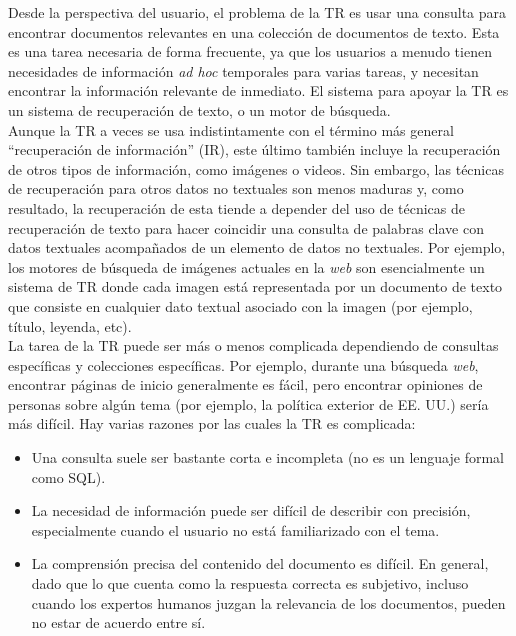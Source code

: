 Desde la perspectiva del usuario, el problema de la TR es usar una consulta para encontrar documentos relevantes en una colección de documentos de texto. Esta es una tarea necesaria de forma frecuente, ya que los usuarios a menudo tienen necesidades de información \textit{ad hoc} temporales para varias tareas, y necesitan encontrar la información relevante de inmediato. El sistema para apoyar la TR es un sistema de recuperación de texto, o un motor de búsqueda. \\

Aunque la TR a veces se usa indistintamente con el término más general ``recuperación de información'' (IR), este último también incluye la recuperación de otros tipos de información, como imágenes o videos. Sin embargo, las técnicas de recuperación para otros datos no textuales son menos maduras y, como resultado, la recuperación de esta tiende a depender del uso de técnicas de recuperación de texto para hacer coincidir una consulta de palabras clave con datos textuales acompañados de un elemento de datos no textuales. Por ejemplo, los motores de búsqueda de imágenes actuales en la \textit{web} son esencialmente un sistema de TR donde cada imagen está representada por un documento de texto que consiste en cualquier dato textual asociado con la imagen (por ejemplo, título, leyenda, etc). \\

La tarea de la TR puede ser más o menos complicada dependiendo de consultas específicas y colecciones específicas. Por ejemplo, durante una búsqueda \textit{web}, encontrar páginas de inicio generalmente es fácil, pero encontrar opiniones de personas sobre algún tema (por ejemplo, la política exterior de EE. UU.) sería más difícil. Hay varias razones por las cuales la TR es complicada:
\begin{itemize}
\item Una consulta suele ser bastante corta e incompleta (no es un lenguaje formal como SQL).
\item La necesidad de información puede ser difícil de describir con precisión, especialmente cuando el usuario no está familiarizado con el tema.
\item La comprensión precisa del contenido del documento es difícil. En general, dado que lo que cuenta como la respuesta correcta es subjetivo, incluso cuando los expertos humanos juzgan la relevancia de los documentos, pueden no estar de acuerdo entre sí.
\end{itemize}

